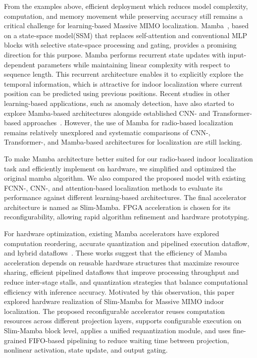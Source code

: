 \documentclass[lettersize,journal]{IEEEtran}
\begin{document}
From the examples above, efficient deployment which reduces model complexity, computation, and 
memory movement while preserving accuracy still remains a critical challenge for
learning-based Massive MIMO localization. Mamba~\cite{Mamba2023}, 
based on a state-space model(SSM) that  replaces self-attention and conventional MLP blocks with selective state-space processing and gating, provides a
promising direction for this purpose. Mamba performs recurrent state updates with
input-dependent parameters while maintaining linear complexity with respect to
sequence length. This recurrent architecture enables it to explicitly explore the temporal information, which is attractive for indoor
localization where current position can be predicted using previous positions. Recent studies in other learning-based applications, such as anomaly detection, have also started to explore Mamba-based architectures alongside established CNN- and Transformer-based approaches~\cite{MambaAD2024}. However, the use of Mamba for radio-based localization remains relatively unexplored and systematic comparisons of CNN-, Transformer-, and Mamba-based architectures for localization are still lacking. 

To make Mamba architecture better suited for our radio-based indoor localization task and efficiently implement on hardware, we simplified and optimized the original mamba algorithm. We also compared the proposed model with existing FCNN-, CNN-, and attention-based localization methods to evaluate its performance against different learning-based architectures. The final accelerator architecture is named as Slim-Mamba. FPGA acceleration is chosen for its reconfigurability, allowing rapid algorithm refinement and hardware prototyping.

For hardware optimization, existing Mamba accelerators
have explored computation reordering, accurate quantization and pipelined execution dataflow, 
and hybrid dataflows~\cite{LightMamba2025,FastMamba2025,HCSA2025,MARCA2024}. These works 
suggest that the efficiency of Mamba acceleration depends on reusable hardware structures that 
maximize resource sharing, efficient pipelined dataflows that improve processing throughput 
and reduce inter-stage stalls, and quantization strategies that balance computational efficiency with 
inference accuracy. Motivated by this
observation, this paper explored hardware realization of Slim-Mamba for
Massive MIMO indoor localization. The proposed reconfigurable accelerator reuses computation 
resources across different projection layers, supports configurable execution on Slim-Mamba block level, applies a unified requantization module, and
uses fine-grained FIFO-based pipelining to reduce waiting time between projection,
nonlinear activation, state update, and output gating.
\end{document}
